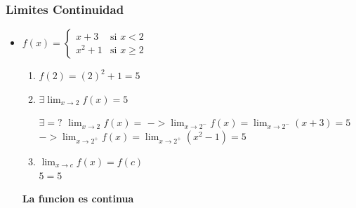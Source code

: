 \documentclass[stu, 12pt, a4paper, donotrepeattitle, floatsintext, natbib]{apa7}
\begin{document}
    \newpage

    \subsubsection{Limites Continuidad}
    \begin{itemize}
        \item $f(x) = \begin{cases}
                          x + 3 & \text{si } x < 2 \\
                          x^2 + 1 & \text{si } x \geq 2
        \end{cases}$\\[0.5cm]
        \begin{enumerate}
            \item $f(2) = (2)^2 + 1 = 5$

            \item $\exists \displaystyle\lim_{x \to 2} f(x) = 5$\\[0.5cm]
            \begin{paracol}{3}
                $\exists = ? $
                \switchcolumn
                $\displaystyle\lim_{x \to 2} f(x)=$
                \switchcolumn
                $-> \displaystyle\lim_{x \to 2^-} f(x) = \displaystyle\lim_{x\to2^-} (x+3) = 5$\\[0.5cm]
                $-> \displaystyle\lim_{x \to 2^+} f(x) = \displaystyle\lim_{x\to2^+} (x^2-1) = 5$\\[0.5cm]
            \end{paracol}

            \item $\displaystyle\lim_{x\to c} f(x) = f(c)$\\[0.5cm]
            $5=5$
        \end{enumerate}
        \textbf{La funcion es continua}
    \end{itemize}

    \newpage
\end{document}
